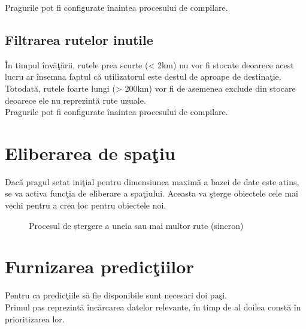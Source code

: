 Pragurile pot fi configurate înaintea procesului de compilare.


	\subsection{Filtrarea rutelor inutile}
	În timpul învăţării, rutele prea scurte (< 2km) nu vor fi stocate deoarece acest lucru ar însemna faptul că utilizatorul este destul de aproape de destinaţie.
	\vspace{6pt}
  \\Totodată, rutele foarte lungi (> 200km) vor fi de asemenea exclude din stocare deoarece ele nu reprezintă rute uzuale.
	\vspace{6pt}
  \\Pragurile pot fi configurate înaintea procesului de compilare.
	
\section{Eliberarea de spaţiu}   
Dacă pragul setat iniţial pentru dimensiunea maximă a bazei de date este atins, se va activa funcţia de eliberare a spaţiului. Aceasta va şterge obiectele cele mai vechi pentru a crea loc pentru obiectele noi.


	\begin{figure}[h!]
   \centering
   \caption{Procesul de ștergere a uneia sau mai multor rute (sincron)}
   \end{figure}	


\section{Furnizarea predicţiilor} 
Pentru ca predicţiile să fie disponibile sunt necesari doi paşi.
\vspace{6pt}
\\Primul pas reprezintă încărcarea datelor relevante, în timp de al doilea constă în prioritizarea lor.

